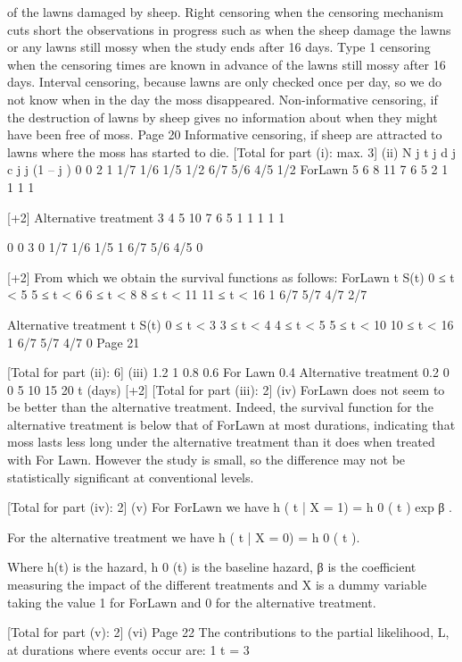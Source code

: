 \documentclass[a4paper,12pt]{article}
\begin{document}
of the lawns damaged by sheep. 
Right censoring when the censoring mechanism cuts short the
observations in progress 
such as when the sheep damage the lawns or any lawns still mossy when
the study ends after 16 days. 
Type 1 censoring when the censoring times are known in advance 
of the lawns still mossy after 16 days. 
Interval censoring, 
because lawns are only checked once per day, so we do not know
when in the day the moss disappeared. 
Non-informative censoring,
if the destruction of lawns by sheep gives no information about when they
might have been free of moss.
Page 20
Informative censoring,
if sheep are attracted to lawns where the moss has started to die.
[Total for part (i): max. 3]
(ii)
N j
t j
d j c j \lambda j (1 – \lambda j )
0
0
2
1 1/7
1/6
1/5
1/2 6/7
5/6
4/5
1/2
ForLawn
5
6
8
11 7
6
5
2 1
1
1
1
  

[+2]
Alternative treatment
3
4
5
10 7
6
5
1 1
1
1
1
  
0
0
3
0
1/7
1/6
1/5
1
6/7
5/6
4/5
0

[+2]
From which we obtain the survival functions as follows:
ForLawn
t S(t)
0 ≤ t < 5
5 ≤ t < 6
6 ≤ t < 8
8 ≤ t < 11
11 ≤ t < 16 1
6/7
5/7
4/7
2/7
 

Alternative treatment
t S(t)
0 ≤ t < 3
3 ≤ t < 4
4 ≤ t < 5
5 ≤ t < 10
10 ≤ t < 16 1
6/7
5/7
4/7
0
Page 21



[Total for part (ii): 6]
(iii)
1.2
1
0.8
0.6
For Lawn
0.4
Alternative
treatment
0.2
0
0
5
10
15
20
t (days)
[+2]
[Total for part (iii): 2]
(iv)
ForLawn does not seem to be better than the alternative treatment. 
Indeed, the survival function for the alternative treatment is below
that of ForLawn at most durations, indicating that moss lasts less
long under the alternative treatment than it does when treated
with For Lawn. 
However the study is small, so the difference may not be statistically
significant at conventional levels.

[Total for part (iv): 2]
(v)
For ForLawn we have
h ( t | X = 1) = h 0 ( t ) exp β .

For the alternative treatment we have
h ( t | X = 0) = h 0 ( t ).

Where h(t) is the hazard, h 0 (t) is the baseline hazard, β is the
coefficient measuring the impact of the different treatments and X is a
dummy variable taking the value 1 for ForLawn and 0 for the alternative
treatment.

[Total for part (v): 2]
(vi)
Page 22
The contributions to the partial likelihood, L, at durations where events occur
are:
1
t = 3
\end{document}
